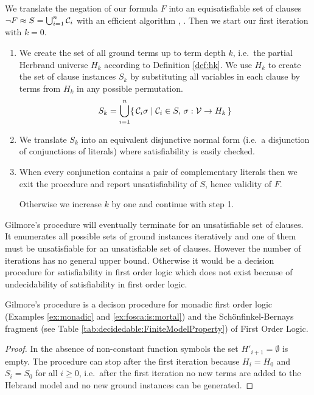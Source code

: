 \begin{procedure}\label{proc:gilmore's:prover}
	We translate the negation of our formula $F$ into an equisatisfiable set of clauses
	$\lnot F \approx S = \bigcup_{i=1}^{n} \mathcal{C}_i$ with an efficient algorithm \cite{tseitin70}, \cite{PLAISTED1986293}.
	Then we start our first iteration with $k=0$.
	\begin{enumerate}

		\item We create the set of all ground terms up to term depth $k$,
		i.e.~the partial Herbrand universe $H_k$ according to Definition \ref{def:hk}.
		We use $H_k$ to create the set of clause instances $S_k$
		by substituting all variables
		in each clause by terms from $H_k$ in any possible permutation.
		\[ S_k = \bigcup_{i=1}^{n}
		\{\,
		\mathcal{C}_i\sigma \mid \mathcal{C}_i \in S,\,\sigma: \mathcal{V}\to H_k
		\,\}
		\]

		\item We translate $S_k$ into an equivalent disjunctive normal form
		(i.e.~a disjunction of conjunctions of literals)
		where satisfiability is easily checked.



		\item When every conjunction contains a pair of complementary literals
		then we exit the procedure and report unsatisfiability of $S$,
		hence validity of $F$.

		Otherwise we increase $k$ by one and continue with step 1.
	\end{enumerate}
\end{procedure}

Gilmore's procedure will eventually terminate for an unsatisfiable set of clauses.
It enumerates all possible sets of ground instances iteratively
and one of them must be unsatisfiable for an unsatisfiable set of clauses.
However the number of iterations has no general upper bound.
Otherwise it would be a decision procedure for satisfiability in first order logic
which does not exist because of undecidability of satisfiability in first order logic.

\begin{lemma}
	Gilmore's procedure is a decison procedure for monadic first order logic
	(Examples \ref{ex:monadic}  and \ref{ex:fosca:is:mortal})
	and the Schönfinkel-Bernays fragment (see Table \ref{tab:decidedable:FiniteModelProperty})
	of First Order Logic.
\end{lemma}

\begin{proof}
	In the absence of non-constant function symbols the set $H'_{i+1} = \emptyset$ is empty.
	The procedure can stop after the first iteration because
	$H_i = H_0$ and $S_i = S_0$ for all $i\geq0$,
	i.e.~after the first iteration
	no new terms are added to the Hebrand model
	and no new ground instances can be generated.
\end{proof}

